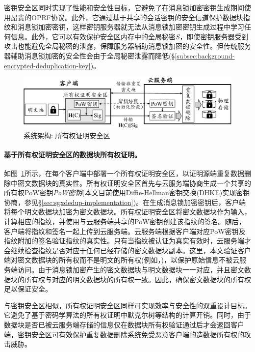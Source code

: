 密钥安全区同时实现了性能和安全性目标，它避免了在消息锁加密密钥生成期间使用昂贵的OPRF协议\cite{bellare2013DupLESS}。此外，它通过基于共享的会话密钥的安全信道保护数据块指纹和消息锁加密密钥，这样密钥服务器就无法从消息锁加密密钥生成过程中学习任何信息。此外，它可以有效保护安全区内存中的全局秘密$S$，即使密钥服务器受到攻击也能避免全局秘密的泄露，保障服务器辅助消息锁加密的安全性。但传统服务器辅助消息锁加密的安全性会由于全局秘密泄露而降低(\S\ref{subsec:background-encrypted-deduplication-key})。

\begin{figure}[!htb]
    \centering
    \includegraphics[width=\textwidth]{pic/sgxdedup/pow.pdf}
    \caption{\sysnameS 系统架构: 所有权证明安全区}
    \label{fig:sgxdedup-overview-pow}
\end{figure}

\paragraph*{基于所有权证明安全区的数据块所有权证明。}如图~\ref{fig:sgxdedup-overview-pow}所示，\sysnameS 在每个客户端中部署一个所有权证明安全区，以证明源端重复数据删除中密文数据块的真实性。所有权证明安全区首先与云服务端协商生成一个共享的所有权PoW密钥\textit{PoW密钥}(本文目前使用Diffie-Hellman密钥交换(DHKE)实现密钥协商，参见\S\ref{sec:sgxdedup-implementation})。在生成消息锁加密密钥后，客户端将每个明文数据块加密为密文数据块。所有权证明安全区将密文数据块作为输入，计算相应的指纹，并使用与云服务端共享的PoW密钥创建该指纹的签名。随后，客户端将指纹和签名一起上传到云服务端。云服务端根据客户端对应PoW密钥及指纹附加的签名验证指纹的真实性。只有当指纹被认证为真实有效时，云服务端才会继续检查指纹是否对应于任何已经存储的密文数据块副本。这里，本文验证客户端对密文数据块的所有权而不是明文的所有权(例如，\cite{halevi11})，以保护原始信息不被云服务端访问。由于消息锁加密产生的密文数据块与明文数据块一一对应，并且密文数据块的所有权与对应的明文数据块的所有权一致。因此，确保密文数据块的所有权足以保证安全。

与密钥安全区相似，所有权证明安全区同样可实现效率与安全性的双重设计目标。它避免了基于密码学算法的所有权证明中默克尔树等结构的计算开销。同时，由于数据块是否已被云服务端存储的信息仅在数据块所有权验证通过后才会返回客户端，密钥安全区可有效保护重复数据删除系统免受恶意客户端的造数据所有权的攻击威胁。

